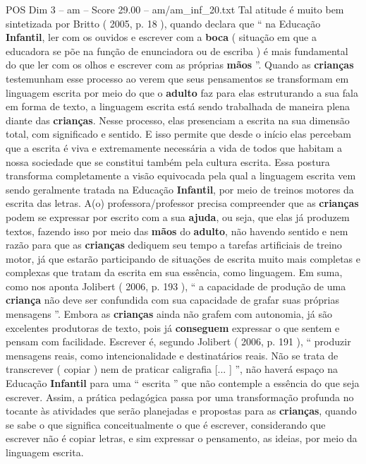 \begin{textsample}{POS Dim 3 – am – Score 29.00 – am/am\_inf\_20.txt}
Tal atitude é muito bem sintetizada por Britto ( 2005, p. 18 ), quando declara que “ na Educação \textbf{Infantil}, ler com os ouvidos e escrever com a \textbf{boca} ( situação em que a educadora se põe na função de enunciadora ou de escriba ) é mais fundamental do que ler com os olhos e escrever com as próprias \textbf{mãos} ”.
Quando as \textbf{crianças} testemunham esse processo ao verem que seus pensamentos se transformam em linguagem escrita por meio do que o \textbf{adulto} faz para elas estruturando a sua fala em forma de texto, a linguagem escrita está sendo trabalhada de maneira plena diante das \textbf{crianças}.
Nesse processo, elas presenciam a escrita na sua dimensão total, com significado e sentido.
E isso permite que desde o início elas percebam que a escrita é viva e extremamente necessária a vida de todos que habitam a nossa sociedade que se constitui também pela cultura escrita.
Essa postura transforma completamente a visão equivocada pela qual a linguagem escrita vem sendo geralmente tratada na Educação \textbf{Infantil}, por meio de treinos motores da escrita das letras.
A(o) professora/professor precisa compreender que as \textbf{crianças} podem se expressar por escrito com a sua \textbf{ajuda}, ou seja, que elas já produzem textos, fazendo isso por meio das \textbf{mãos} do \textbf{adulto}, não havendo sentido e nem razão para que as \textbf{crianças} dediquem seu tempo a tarefas artificiais de treino motor, já que estarão participando de situações de escrita muito mais completas e complexas que tratam da escrita em sua essência, como linguagem.
Em suma, como nos aponta Jolibert ( 2006, p. 193 ), “ a capacidade de produção de uma \textbf{criança} não deve ser confundida com sua capacidade de grafar suas próprias mensagens ”.
Embora as \textbf{crianças} ainda não grafem com autonomia, já são excelentes produtoras de texto, pois já \textbf{conseguem} expressar o que sentem e pensam com facilidade.
Escrever é, segundo Jolibert ( 2006, p. 191 ), “ produzir mensagens reais, como intencionalidade e destinatários reais.
Não se trata de transcrever ( copiar ) nem de praticar caligrafia [... ] ”, não haverá espaço na Educação \textbf{Infantil} para uma “ escrita ” que não contemple a essência do que seja escrever.
Assim, a prática pedagógica passa por uma transformação profunda no tocante às atividades que serão planejadas e propostas para as \textbf{crianças}, quando se sabe o que significa conceitualmente o que é escrever, considerando que escrever não é copiar letras, e sim expressar o pensamento, as ideias, por meio da linguagem escrita.

\end{textsample}

